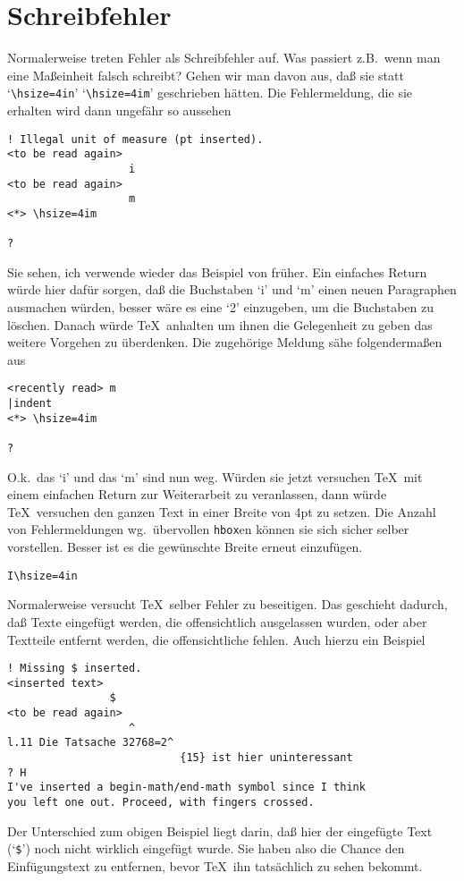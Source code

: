 \section{Schreibfehler}
Normalerweise treten Fehler als Schreibfehler auf. Was passiert z.B.\
wenn man eine 
Ma\ss{}einheit falsch schreibt? Gehen wir man davon aus, da\ss{}
sie statt
`\verb|\hsize=4in|' `\verb|\hsize=4im|' geschrieben h\"atten.
Die Fehlermeldung, die sie erhalten wird dann ungef\"ahr so aussehen
\index{zzzinput@{\tt\char92 input}}
\begin{verbatim}
! Illegal unit of measure (pt inserted).
<to be read again>
                   i
<to be read again>
                   m
<*> \hsize=4im
               
?
\end{verbatim}
Sie sehen, ich verwende wieder das Beispiel von fr\"uher. Ein einfaches
Return w\"urde hier daf\"ur sorgen, da\ss{} die Buchstaben `i' und `m' einen
neuen Paragraphen ausmachen w\"urden, besser w\"are es eine `2'
einzugeben, um die Buchstaben zu l\"oschen. Danach w\"urde \TeX\ anhalten
um ihnen die Gelegenheit zu geben das weitere Vorgehen zu \"uberdenken.
Die zugeh\"orige Meldung s\"ahe folgenderma\ss{}en aus
\begin{verbatim}
<recently read> m
|indent
<*> \hsize=4im
               
?
\end{verbatim}
O.k.\ das `i' und das `m' sind nun weg. W\"urden sie jetzt versuchen
\TeX\ mit einem einfachen Return zur Weiterarbeit zu veranlassen, dann
w\"urde \TeX\ versuchen den ganzen Text in einer Breite von 4pt zu
setzen. Die Anzahl von Fehlermeldungen wg.\ \"ubervollen 
{\tt hbox}en k\"onnen
sie sich sicher selber vorstellen. Besser ist es die gew\"unschte Breite
erneut einzuf\"ugen.
\begin{verbatim}
I\hsize=4in
\end{verbatim}

Normalerweise versucht \TeX\ selber Fehler zu beseitigen. Das
geschieht dadurch, da\ss{} Texte eingef\"ugt werden, die offensichtlich
ausgelassen wurden, oder aber Textteile entfernt werden, die
offensichtliche fehlen. Auch hierzu ein Beispiel
\begin{verbatim}
! Missing $ inserted.
<inserted text>
                $
<to be read again>
                   ^
l.11 Die Tatsache 32768=2^
                           {15} ist hier uninteressant
? H
I've inserted a begin-math/end-math symbol since I think
you left one out. Proceed, with fingers crossed.
\end{verbatim}
Der Unterschied zum obigen Beispiel liegt darin, da\ss{} hier der
eingef\"ugte Text (`\verb|$|') noch nicht wirklich eingef\"ugt wurde. Sie
haben also die Chance den \index{Einfuegung!Text@Einf\"ugung!Text}
Einf\"ugungstext zu entfernen, bevor \TeX\ ihn
tats\"achlich zu sehen bekommt.

